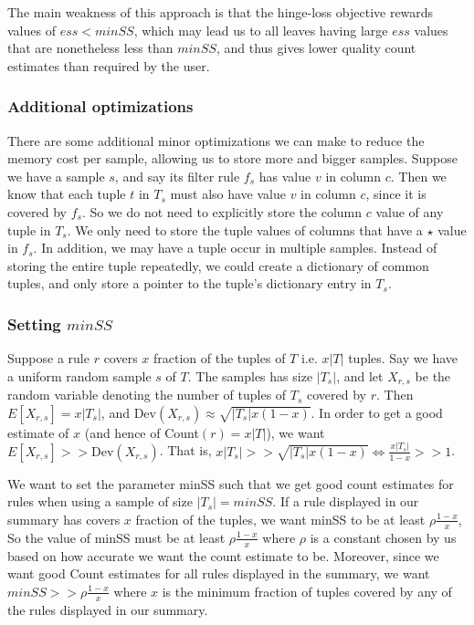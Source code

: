 {The main weakness of this approach is that the hinge-loss objective rewards values of $ess < minSS$, which may lead us to all leaves having large $ess$ values that are nonetheless less than $minSS$, and thus gives lower quality count estimates than required by the user.


\subsubsection{Additional optimizations}
There are some additional minor optimizations we can make to reduce the memory cost per sample, allowing us to store more and bigger samples. 
Suppose we have a sample $s$, and say its filter rule $f_s$ has value $v$ in column $c$. Then we know that each tuple $t$ in $T_s$ must also have value $v$ in column $c$, since it is covered by $f_s$. So we do not need to explicitly store the column $c$ value of any tuple in $T_s$. We only need to store the tuple values of columns that have a $\star$ value in $f_s$.
In addition, we may have a tuple occur in multiple samples. Instead of storing the entire tuple repeatedly, we could create a dictionary of common tuples, and only store a pointer to the tuple's dictionary entry in $T_s$. 


\subsubsection{Setting $minSS$}
Suppose a rule $r$ covers $x$ fraction of the tuples of $T$ i.e. $x|T|$ tuples. Say we have a uniform random sample $s$ of $T$. The samples has size $|T_s|$, and let $X_{r,s}$ be the random variable denoting the number of tuples of $T_s$ covered by $r$. Then $E\left[ X_{r,s} \right] = x|T_s|$, and $\text{Dev}(X_{r,s}) \approx \sqrt{|T_s|x(1-x)}$. In order to get a good estimate of $x$ (and hence of Count$(r) = x|T|$), we want $E\left[X_{r,s}\right] >> \text{Dev}(X_{r,s})$. That is, $x|T_s| >> \sqrt{|T_s|x(1-x)} \Leftrightarrow \frac{x|T_s|}{1-x} >> 1$. 

We want to set the parameter minSS such that we get good count estimates for rules when using a sample of size $|T_s| = minSS$. If a rule displayed in our summary has covers $x$ fraction of the tuples, we want minSS to be at least $\rho\frac{1-x}{x}$, So the value of minSS must be at least $\rho\frac{1-x}{x}$ where $\rho$ is a constant chosen by us based on how accurate we want the count estimate to be. Moreover, since we want good Count estimates for all rules displayed in the summary, we want $minSS >> \rho\frac{1-x}{x}$ where $x$ is the minimum fraction of tuples covered by any of the rules displayed in our summary.

}
